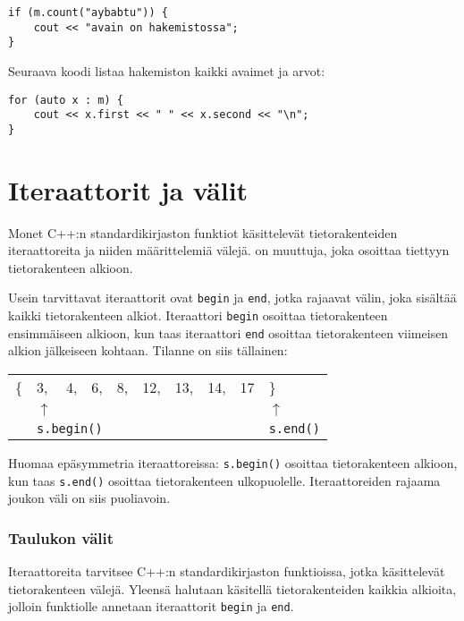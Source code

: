 \begin{lstlisting}
if (m.count("aybabtu")) {
    cout << "avain on hakemistossa";
}
\end{lstlisting}

Seuraava koodi listaa hakemiston
kaikki avaimet ja arvot:

\begin{lstlisting}
for (auto x : m) {
    cout << x.first << " " << x.second << "\n";
}
\end{lstlisting}

\section{Iteraattorit ja välit}


Monet C++:n standardikirjaston funktiot
käsittelevät tietorakenteiden iteraattoreita
ja niiden määrittelemiä välejä.
 on muuttuja,
joka osoittaa tiettyyn tietorakenteen alkioon.

Usein tarvittavat iteraattorit ovat \texttt{begin}
ja \texttt{end}, jotka rajaavat välin,
joka sisältää kaikki tietorakenteen alkiot.
Iteraattori \texttt{begin} osoittaa
tietorakenteen ensimmäiseen alkioon,
kun taas iteraattori \texttt{end} osoittaa
tietorakenteen viimeisen alkion jälkeiseen kohtaan.
Tilanne on siis tällainen:

\begin{center}
\begin{tabular}{llllllllll}
\{ & 3, & 4, & 6, & 8, & 12, & 13, & 14, & 17 & \} \\
& $\uparrow$ & & & & & & & & $\uparrow$ \\
& \multicolumn{3}{l}{\texttt{s.begin()}} & & & & & & \texttt{s.end()} \\
\end{tabular}
\end{center}

Huomaa epäsymmetria iteraattoreissa:
\texttt{s.begin()} osoittaa tietorakenteen alkioon,
kun taas \texttt{s.end()} osoittaa tietorakenteen ulkopuolelle.
Iteraattoreiden rajaama joukon väli on siis puoliavoin.

\subsubsection{Taulukon välit}

Iteraattoreita tarvitsee
C++:n standardikirjaston funktioissa, jotka käsittelevät
tietorakenteen välejä.
Yleensä halutaan käsitellä tietorakenteiden kaikkia
alkioita, jolloin funktiolle annetaan
iteraattorit \texttt{begin} ja \texttt{end}.

